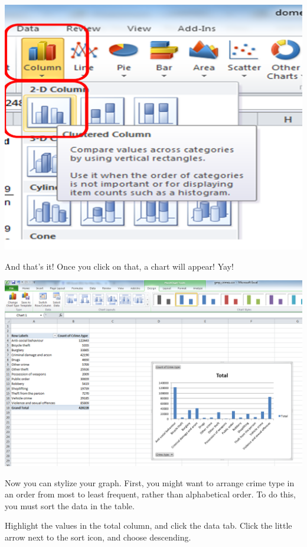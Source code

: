\documentclass[
]{book}
\begin{document}
\includegraphics{imgs/pc_cluster_bar.png}

And that's it! Once you click on that, a chart will appear! Yay!

\includegraphics{imgs/chart_appears.png}

Now you can stylize your graph. First, you might want to arrange crime type in an order from most to least frequent, rather than alphabetical order. To do this, you must sort the data in the table.

Highlight the values in the total column, and click the data tab. Click the little arrow next to the sort icon, and choose descending.
\end{document}
